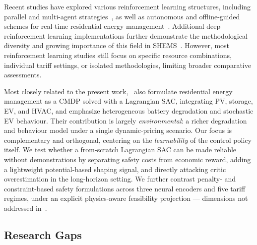 \documentclass[preprint,12pt, 3p]{elsarticle}
\begin{document}
Recent studies have explored various reinforcement learning structures, including parallel and multi-agent strategies~\cite{zhang2026parallel-e48,abishu2025multiagent-b59}, as well as autonomous and offline-guided schemes for real-time residential energy management~\cite{aldahmashi2024real-time-078,xiong2026offline-67f}. Additional deep reinforcement learning implementations further demonstrate the methodological diversity and growing importance of this field in \gls{SHEMS}~\cite{lissa2021deep-fe8,rehman2026iot-4dc}. However, most reinforcement learning studies still focus on specific resource combinations, individual tariff settings, or isolated methodologies, limiting broader comparative assessments.

Most closely related to the present work,~\cite{yuan2026reinforcement-dd1} also formulate residential energy management as a \gls{CMDP} solved with a Lagrangian \gls{SAC}, integrating \gls{PV}, storage, \gls{EV}, and HVAC, and emphasize heterogeneous battery degradation and stochastic \gls{EV} behaviour. Their contribution is largely \emph{environmental}: a richer degradation and behaviour model under a single dynamic-pricing scenario. Our focus is complementary and orthogonal, centering on the \emph{learnability} of the control policy itself. We test whether a from-scratch Lagrangian \gls{SAC} can be made reliable without demonstrations by separating safety costs from economic reward, adding a lightweight potential-based shaping signal, and directly attacking critic overestimation in the long-horizon setting. We further contrast penalty- and constraint-based safety formulations across three neural encoders and five tariff regimes, under an explicit physics-aware feasibility projection --- dimensions not addressed in~\cite{yuan2026reinforcement-dd1}.

\subsection{Research Gaps}
\end{document}
